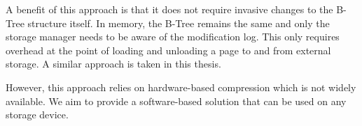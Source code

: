 A benefit of this approach is that it does not require invasive changes to the B-Tree structure itself.
In memory, the B-Tree remains the same and only the storage manager needs to be aware of the modification log.
This only requires overhead at the point of loading and unloading a page to and from external storage.
A similar approach is taken in this thesis.

However, this approach relies on hardware-based compression which is not widely available.
We aim to provide a software-based solution that can be used on any storage device.

    